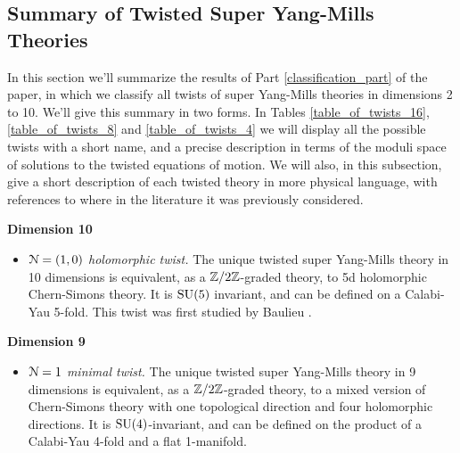 \documentclass[10pt, oneside]{article}
\begin{document}
\subsection*{Summary of Twisted Super Yang-Mills Theories}
In this section we'll summarize the results of Part \ref{classification_part} of the paper, in which we classify all twists of super Yang-Mills theories in dimensions 2 to 10.  We'll give this summary in two forms.  In Tables \ref{table_of_twists_16}, \ref{table_of_twists_8} and \ref{table_of_twists_4} we will display all the possible twists with a short name, and a precise description in terms of the moduli space of solutions to the twisted equations of motion.  We will also, in this subsection, give a short description of each twisted theory in more physical language, with references to where in the literature it was previously considered.

\textbf{Dimension 10}
\begin{itemize}
 \item \emph{$\mathcal{N}=(1,0)$ holomorphic twist.} The unique twisted super Yang-Mills theory in 10 dimensions is equivalent, as a $\mathbb Z/2\mathbb Z$-graded theory, to 5d holomorphic Chern-Simons theory.  It is $\mathrm{SU}(5)$ invariant, and can be defined on a Calabi-Yau 5-fold.  This twist was first studied by Baulieu \cite{Baulieu}.
\end{itemize}

\textbf{Dimension 9}
\begin{itemize}
 \item \emph{$\mathcal{N}=1$ minimal twist.} The unique twisted super Yang-Mills theory in 9 dimensions is equivalent, as a $\mathbb Z/2\mathbb Z$-graded theory, to a mixed version of Chern-Simons theory with one topological direction and four holomorphic directions.  It is $\mathrm{SU}(4)$-invariant, and can be defined on the product of a Calabi-Yau 4-fold and a flat 1-manifold. 
\end{itemize}
\end{document}
